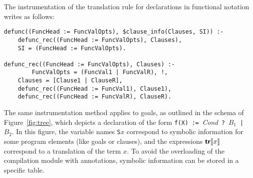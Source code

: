 \documentclass[preprint]{llncs}
\newcommand{\pre}[1]{\texttt{#1}}
\begin{document}
\begin{example} The instrumentation of the translation rule for declarations in
functional notation writes as follows:
\label{ex:syminstr}

\begin{lstlisting}[numbers=none,frame=none, mathescape=no]
defunc((FuncHead := FuncValOpts), $clause_info(Clauses, SI)) :-
    defunc_rec((FuncHead := FuncValOpts), Clauses),
    SI = (FuncHead := FuncValOpts).

defunc_rec((FuncHead := FuncValOpts), Clauses) :- 
	    FuncValOpts = (FuncVal1 | FuncValR), !,
    Clauses = [Clause1 | ClauseR],
    defunc_rec((FuncHead := FuncVal1), Clause1),
    defunc_rec((FuncHead := FuncValR), ClauseR).
\end{lstlisting}
\end{example}

The same instrumentation method applies to goals, as outlined in the
schema of Figure~\ref{fig:tree}, which depicts a declaration of the
form \texttt{f(X) := }\textit{Cond}\texttt{ ? }$B_1$\texttt{ |
}$B_2$. In this figure, the variable names \pre{S$x$} correspond to
symbolic information for some program elements (like goals or
clauses), and the expressions $\mbox{\textsf{\textbf{tr}}}\llbracket x\rrbracket$ correspond to a
translation of the term $x$. To avoid the overloading of the
compilation module with annotations, symbolic information can be
stored in a specific table.
\end{document}
